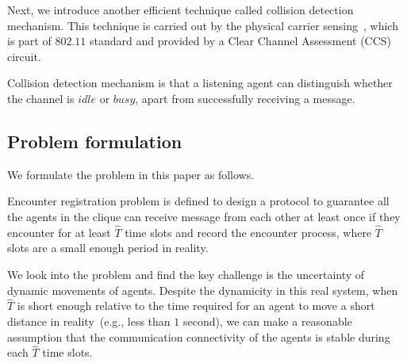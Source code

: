 
 

Next, we introduce another efficient technique called collision detection mechanism.
This technique is carried out by the physical carrier sensing~\cite{Yang2005On}, which is part of 
$802.11$ standard and provided by a Clear Channel Assessment (CCS) circuit.

Collision detection mechanism is that
a listening agent can distinguish whether the channel is $idle$ or $busy$, 
apart from successfully receiving a message. 

\subsection{Problem formulation}

We formulate the problem in this paper as follows.
\begin{problem}
    Encounter registration problem is defined to design a protocol to guarantee 
    all the agents in the clique can receive message from each other at least once 
    if they encounter for at least $\hat{T}$ time slots and record the encounter process,
    where $\hat{T}$ slots are a small enough period in reality. 
\end{problem}

We look into the problem and find the key challenge is 
the uncertainty of dynamic movements
of agents. Despite the dynamicity in this real system, 
when $\hat{T}$ is short enough relative to 
the time required for an agent to move a short distance
in reality~(e.g., less than $1$ second),
we can make a reasonable assumption that the communication 
connectivity of the agents is stable during each $\hat{T}$ time slots. 

